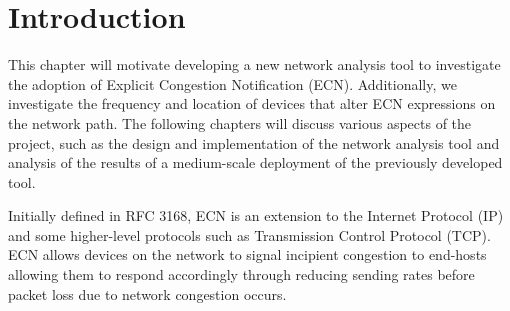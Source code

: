 \documentclass{l4proj}
\begin{document}
%
%
%
%
%
%
%


\chapter{Introduction}
\label{chap:introduction}


This chapter will motivate developing a new network analysis tool to investigate the adoption of Explicit Congestion Notification (ECN). Additionally, we investigate the frequency and location of devices that alter ECN expressions on the network path. The following chapters will discuss various aspects of the project, such as the design and implementation of the network analysis tool and analysis of the results of a medium-scale deployment of the previously developed tool.

Initially defined in RFC 3168, ECN is an extension to the Internet Protocol (IP) and some higher-level protocols such as Transmission Control Protocol (TCP). ECN allows devices on the network to signal incipient congestion to end-hosts allowing them to respond accordingly through reducing sending rates before packet loss due to network congestion occurs\cite{rfc3168}.
\end{document}
